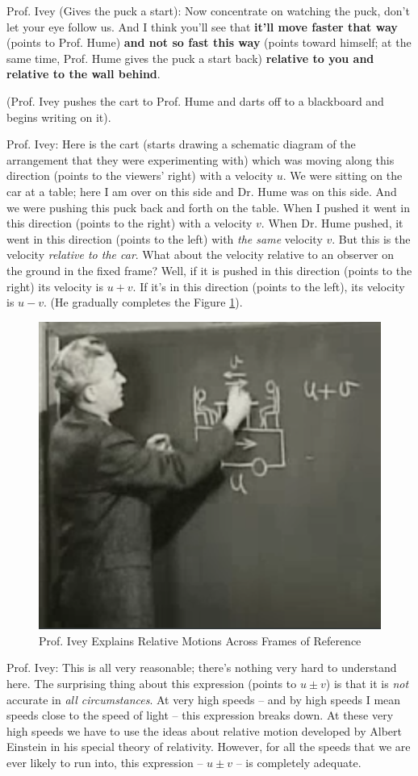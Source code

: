 \documentclass[a6paper]{article}
\begin{document}
Prof. Ivey (Gives the puck a start): Now concentrate on watching the puck, don't let your eye follow us. And I think you'll see that \textbf{it'll move faster that way} (points to Prof. Hume) \textbf{and not so fast this way} (points toward himself; at the same time, Prof. Hume gives the puck a start back) \textbf{relative to you and relative to the wall behind}.

(Prof. Ivey pushes the cart to Prof. Hume and darts off to a blackboard and begins writing on it).

Prof. Ivey: Here is the cart (starts drawing a schematic diagram of the arrangement that they were experimenting with) which was moving along this direction (points to the viewers' right) with a velocity $u$. We were sitting on the car at a table; here I am over on this side and Dr. Hume was on this side. And we were pushing this puck back and forth on the table. When I pushed it went in this direction (points to the right) with a velocity $v$. When Dr. Hume pushed, it went in this direction (points to the left) with \emph{the same} velocity $v$. But this is the velocity \emph{relative to the car}. What about the velocity relative to an observer on the ground in the fixed frame? Well, if it is pushed in this direction (points to the right) its velocity is $u+v$. If it's in this direction (points to the left), its velocity is $u-v$. (He gradually completes the Figure \ref{fig: prof-ivey-explains-relative-motions}).
        \begin{figure}[h!]
            \centering
            \includegraphics[width=0.5\linewidth]{prof-ivey-explains-relative-motions.png}
            \caption{Prof. Ivey Explains Relative Motions Across Frames of Reference}
            \label{fig: prof-ivey-explains-relative-motions}
        \end{figure}

Prof. Ivey: This is all very reasonable; there's nothing very hard to understand here. The surprising thing about this expression (points to $u\pm v$) is that it is \emph{not} accurate in \emph{all circumstances}. At very high speeds -- and by high speeds I mean speeds close to the speed of light -- this expression breaks down. At these very high speeds we have to use the ideas about relative motion developed by Albert Einstein in his special theory of relativity. However, for all the speeds that we are ever likely to run into, this expression -- $u\pm v$ -- is completely adequate. 
\end{document}
